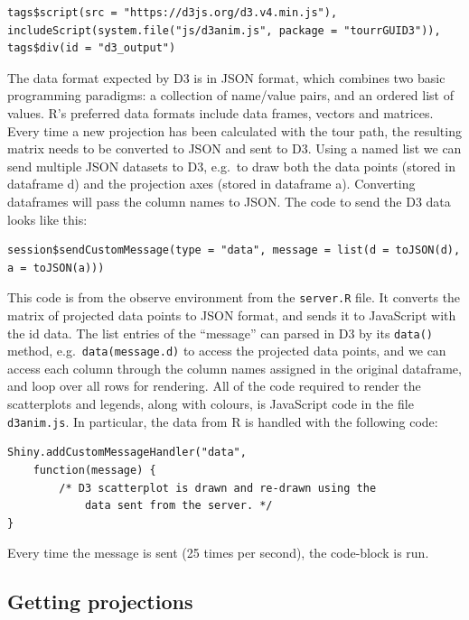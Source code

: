 \begin{verbatim}
tags$script(src = "https://d3js.org/d3.v4.min.js"),
includeScript(system.file("js/d3anim.js", package = "tourrGUID3")),
tags$div(id = "d3_output")
\end{verbatim}

The data format expected by D3 is in JSON format, which combines two
basic programming paradigms: a collection of name/value pairs, and an
ordered list of values. R's preferred data formats include data frames,
vectors and matrices. Every time a new projection has been calculated
with the tour path, the resulting matrix needs to be converted to JSON
and sent to D3. Using a named list we can send multiple JSON datasets to
D3, e.g.~to draw both the data points (stored in dataframe d) and the
projection axes (stored in dataframe a). Converting dataframes will pass
the column names to JSON. The code to send the D3 data looks like this:

\begin{verbatim}
session$sendCustomMessage(type = "data", message = list(d = toJSON(d), a = toJSON(a)))
\end{verbatim}

This code is from the observe environment from the \texttt{server.R}
file. It converts the matrix of projected data points to JSON format,
and sends it to JavaScript with the id data. The list entries of the
``message'' can parsed in D3 by its \texttt{data()} method,
e.g.~\texttt{data(message.d)} to access the projected data points, and
we can access each column through the column names assigned in the
original dataframe, and loop over all rows for rendering. All of the
code required to render the scatterplots and legends, along with
colours, is JavaScript code in the file \texttt{d3anim.js}. In
particular, the data from R is handled with the following code:

\begin{verbatim}
Shiny.addCustomMessageHandler("data",
    function(message) {
        /* D3 scatterplot is drawn and re-drawn using the
            data sent from the server. */
}
\end{verbatim}

Every time the message is sent (25 times per second), the code-block is
run.

\hypertarget{getting-projections}{%
\subsection{Getting projections}\label{getting-projections}}

